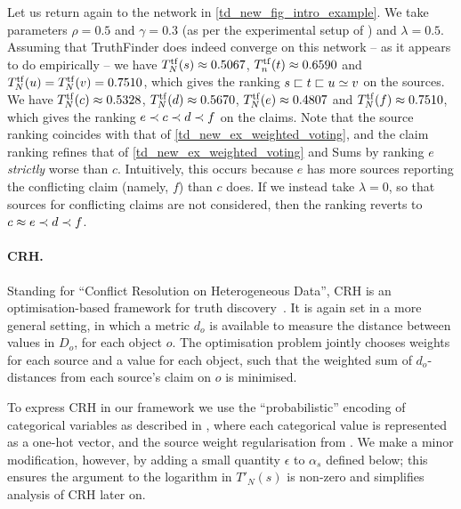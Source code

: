Let us return again to the network in \cref{td_new_fig_intro_example}. We take
parameters $\rho = 0.5$ and $\gamma = 0.3$ (as per the experimental setup of
\textcite{yin2008}) and $\lambda = 0.5$. Assuming that TruthFinder does indeed
converge on this network -- as it appears to do empirically -- we have
$T^{\operatorname{tf}}_N(s) \approx 0.5067$, $T^{\operatorname{tf}}_n(t) \approx 0.6590$ and
$T^{\operatorname{tf}}_N(u) = T^{\operatorname{tf}}_N(v) = 0.7510$, which gives the ranking $s
\sqsubset t \sqsubset u \simeq v$ on the sources. We have $T^{\operatorname{tf}}_N(c) \approx
0.5328$, $T^{\operatorname{tf}}_N(d) \approx 0.5670$, $T^{\operatorname{tf}}_N(e) \approx 0.4807$
and $T^{\operatorname{tf}}_N(f) \approx 0.7510$, which gives the ranking $e \prec c \prec
d \prec f$ on the claims. Note that the source ranking coincides with that of
\cref{td_new_ex_weighted_voting}, and the claim ranking refines that of
\cref{td_new_ex_weighted_voting} and Sums by ranking $e$ \emph{strictly} worse
than $c$. Intuitively, this occurs because $e$ has more sources reporting the
conflicting claim (namely, $f$) than $c$ does. If we instead take $\lambda =
0$, so that sources for conflicting claims are not considered, then the ranking
reverts to $c \approx e \prec d \prec f$.

\paragraph{CRH.} Standing for ``Conflict Resolution on Heterogeneous Data'', CRH
is an optimisation-based framework for truth discovery~\cite{li2016}. It is
again set in a more general setting, in which a metric $d_o$ is available to
measure the distance between values in $D_o$, for each object $o$. The
optimisation problem jointly chooses weights for each source and a value for
each object, such that the weighted sum of $d_o$-distances from each source's
claim on $o$ is minimised.

To express CRH in our framework we use the ``probabilistic'' encoding of
categorical variables as described in \cite[]{li2016},
where each categorical value is represented as a one-hot vector, and the source
weight regularisation from \cite[Eq. (4)]{li2016}. We make a minor
modification, however, by adding a small quantity $\epsilon$ to $\alpha_s$
defined below; this ensures the argument to the logarithm in $T'_N(s)$ is
non-zero and simplifies analysis of CRH later on.

